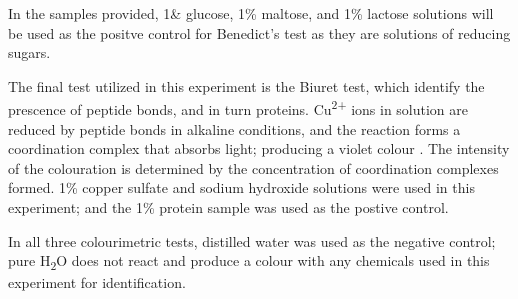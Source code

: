     In the samples provided, 1\& glucose, 1\% maltose, and 1\% lactose solutions will be used as the positve control for Benedict's test as they are solutions of reducing sugars.


    The final test utilized in this experiment is the Biuret test, which identify the prescence of peptide bonds, and in turn proteins. Cu\textsuperscript{2+} ions in solution are reduced by peptide bonds in alkaline conditions, and the reaction forms a coordination complex that absorbs light; producing a violet colour \parencite{Bhagavan2002}. The intensity of the colouration is determined by the concentration of coordination complexes formed. 1\% copper sulfate and sodium hydroxide solutions were used in this experiment; and the 1\% protein sample was used as the postive control.

    In all three colourimetric tests, distilled water was used as the negative control; pure H\textsubscript{2}O does not react and produce a colour with any chemicals used in this experiment for identification.


    